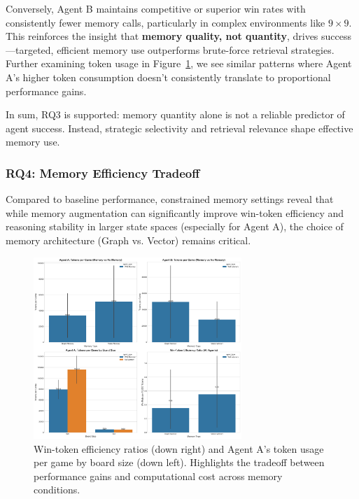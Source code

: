 \documentclass[10pt]{article}
\begin{document}
Conversely, Agent B maintains competitive or superior win rates with consistently fewer memory calls, particularly in complex environments like $9\times9$. This reinforces the insight that \textbf{memory quality, not quantity}, drives success—targeted, efficient memory use outperforms brute-force retrieval strategies. Further examining token usage in Figure~\ref{fig:memory_efficiency_tradeoff}, we see similar patterns where Agent A's higher token consumption doesn't consistently translate to proportional performance gains.

In sum, RQ3 is supported: memory quantity alone is not a reliable predictor of agent success. Instead, strategic selectivity and retrieval relevance shape effective memory use.

\subsubsection{RQ4: Memory Efficiency Tradeoff}

Compared to baseline performance, constrained memory settings reveal that while memory augmentation can significantly improve win-token efficiency and reasoning stability in larger state spaces (especially for Agent A), the choice of memory architecture (Graph vs. Vector) remains critical.

\begin{figure}[ht]
\centering
\includegraphics[width=0.7\textwidth]{figures/memory_baseline/memory_token_efficiency.png}
\caption{Win-token efficiency ratios (down right) and Agent A's token usage per game by board size (down left). Highlights the tradeoff between performance gains and computational cost across memory conditions.}
\label{fig:memory_efficiency_tradeoff}
\end{figure}
\end{document}
